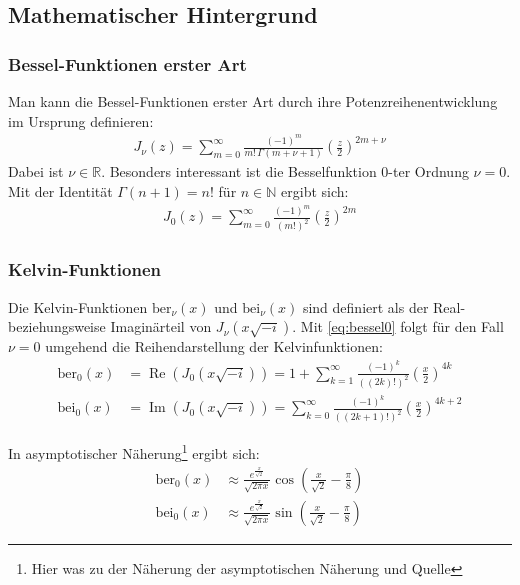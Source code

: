 \documentclass[10pt,a4paper]{article}
\begin{document}
\subsection{Mathematischer Hintergrund}

\subsubsection{Bessel-Funktionen erster Art}

Man kann die Bessel-Funktionen erster Art durch ihre Potenzreihenentwicklung im Ursprung definieren:
\begin{align}
	J_\nu(z) = \sum^{\infty}_{m=0} \frac{\left( -1 \right)^m}{m! \, \Gamma(m + \nu + 1)} \left(\frac{z}{2}\right)^{2m+\nu}
\end{align}
Dabei ist $\nu \in \mathbb{R}$. Besonders interessant ist die Besselfunktion 0-ter Ordnung $\nu = 0$.
Mit der Identität $\Gamma(n+1) = n!$ für $n \in \mathbb{N}$ ergibt sich:
\begin{align}
	\label{eq:bessel0}
	J_0(z) = \sum^{\infty}_{m=0} \frac{\left( -1 \right)^m}{\left( m! \right)^2} \left( \frac{z}{2} \right)^{2m}
\end{align}

\subsubsection{Kelvin-Funktionen}

Die Kelvin-Funktionen $\mathrm{ber}_\nu(x)$ und $\mathrm{bei}_\nu(x)$ sind definiert als der Real-
beziehungsweise Imaginärteil von $J_\nu(x \sqrt{-i} )$. Mit \ref{eq:bessel0}
folgt für den Fall $\nu = 0$ umgehend die Reihendarstellung der Kelvinfunktionen:
\begin{align}
	\mathrm{ber}_0(x) &= \operatorname{Re}\left(J_0(x \sqrt{-i} )\right) = 1 + \sum^{\infty}_{k=1} \frac{\left( -1 \right)^k}{\left( \left(2k\right)! \right)^2} \left( \frac{x}{2} \right)^{4k}\\
	\mathrm{bei}_0(x) &= \operatorname{Im}\left(J_0(x \sqrt{-i} )\right) = \sum^{\infty}_{k=0} \frac{\left( -1 \right)^k}{\left( \left(2k+1\right)! \right)^2} \left( \frac{x}{2} \right)^{4k+2}
\end{align}

In asymptotischer Näherung\footnote{Hier was zu der Näherung der asymptotischen Näherung und Quelle} ergibt sich:
\begin{align}
	\mathrm{ber}_0(x) &\approx \frac{e^{\frac{x}{\sqrt{2}}}}{\sqrt{2 \pi x}} \cos\left(\frac{x}{\sqrt{2}} - \frac{\pi}{8}\right)\\
	\mathrm{bei}_0(x) &\approx \frac{e^{\frac{x}{\sqrt{2}}}}{\sqrt{2 \pi x}} \sin\left(\frac{x}{\sqrt{2}} - \frac{\pi}{8}\right)
\end{align}
\end{document}
